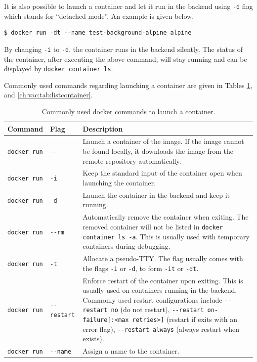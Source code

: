 It is also possible to launch a container and let it run in the backend using \verb|-d| flag which stands for ``detached mode''. An example is given below.
\begin{lstlisting}
$ docker run -dt --name test-background-alpine alpine
\end{lstlisting}
By changing \verb|-i| to \verb|-d|, the container runs in the backend silently. The status of the container, after executing the above command, will stay running and can be displayed by \verb|docker container ls|.

Commonly used commands regarding launching a container are given in Tables \ref{ch:vac:tab:launchcontainer}, and \ref{ch:vac:tab:listcontainer}.

\begin{table}
	\centering \caption{Commonly used docker commands to launch a container.}\label{ch:vac:tab:launchcontainer}
	\begin{tabularx}{\textwidth}{llX}
		\hline
		Command & Flag & Description \\ \hline
		\verb|docker run| & --- & Launch a container of the image. If the image cannot be found locally, it downloads the image from the remote repository automatically. \\ 
        \verb|docker run| & \verb|-i| & Keep the standard input of the container open when launching the container. \\ 
        \verb|docker run| & \verb|-d| & Launch the container in the backend and keep it running. \\ 
        \verb|docker run| & \verb|--rm| & Automatically remove the container when exiting. The removed container will not be listed in \verb|docker container ls -a|. This is usually used with temporary containers during debugging. \\ 
        \verb|docker run| & \verb|-t| & Allocate a pseudo-TTY. The flag usually comes with the flags \verb|-i| or \verb|-d|, to form \verb|-it| or \verb|-dt|. \\ 
        \verb|docker run| & \verb|--restart| & Enforce restart of the container upon exiting. This is usually used on containers running in the backend. Commonly used restart configurations include \verb|--restart no| (do not restart), \verb|--restart on-failure[:<max retries>]| (restart if exits with an error flag), \verb|--restart always| (always restart when exists). \\ 
        \verb|docker run| & \verb|--name| & Assign a name to the container. \\
		\hline
	\end{tabularx}
\end{table}

